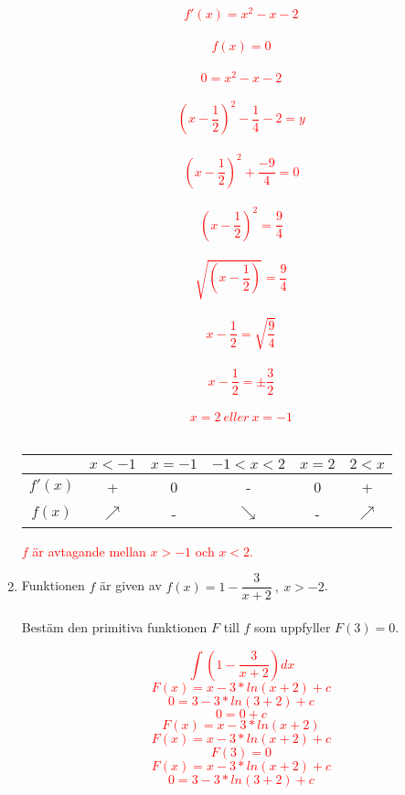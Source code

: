 \documentclass[12pt, letterpaper, twoside]{article}
\begin{document}
\begin{flushleft}
\begin{enumerate}[label=\textbf{\arabic*)}]
   \textcolor{red}{
      $$ f'(x) = x^2 - x - 2 $$\\
      $$ f(x) = 0 $$\\
      $$ 0 = x^2 - x - 2 $$\\
      $$ (x-\frac{1}{2})^2 - \frac{1}{4}-2 = y $$\\
      $$ (x-\frac{1}{2})^2 + \frac{-9}{4} = 0 $$\\
      $$ (x-\frac{1}{2})^2 = \frac{9}{4} $$\\
      $$ \sqrt{(x-\frac{1}{2})} = \frac{9}{4} $$\\
      $$ x-\frac{1}{2} = \sqrt{\frac{9}{4}} $$\\
      $$ x-\frac{1}{2} = \pm\frac{3}{2} $$\\
      $$ x = 2\ eller\ x=-1 $$
      \hfill\\
    \begin{center}
        \begin{tabular}{ |c|c|c|c|c|c| }
           \hline
                     & $ x<-1 $ & $ x=-1 $ & $ -1<x<2 $ & $ x=2 $ & $ 2 < x $  \\
           \hline
           $ f'(x) $ &    +     & 0        & -          & 0       &  +         \\
           \hline
           $ f(x) $  & $\nearrow$ & -      & $\searrow$ & -       & $\nearrow$ \\
           \hline
        \end{tabular}
    \end{center}
    $ f $ är avtagande mellan $ x>-1 $ och $ x<2 $.
   }

   \hfill

   \item
   Funktionen $ f $ är given av $ f(x)=1-\dfrac{3}{x+2}\ ,\ x>-2 $.\\
   \hfill\\
   Bestäm den primitiva funktionen $ F $ till $ f $ som uppfyller $ F(3)=0 $.

   \textcolor{red}{
      $$  \int(1-\frac{3}{x+2})dx $$
      $$ F(x) = x-3*ln(x+2) + c $$
      $$ 0 = 3-3*ln(3+2) + c $$
      $$ 0 = 0 + c $$
      $$ F(x) = x-3*ln(x+2) $$
      $$ F(x) =  x- 3*ln(x+2) + c $$
      $$ F(3) =0  $$
     $$ F(x) =x- 3*ln(x+2) + c $$
     $$ 0 = 3-3*ln(3+2) + c $$
   }


\end{enumerate}
\end{flushleft}
\end{document}
